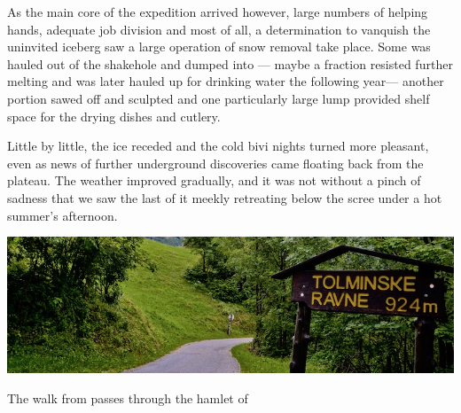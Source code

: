 As the main core of the expedition arrived however, large numbers of helping hands, adequate job division and most of all, a determination to vanquish the uninvited iceberg saw a large operation of snow removal take place. Some was hauled out of the shakehole and dumped into  --- maybe a fraction resisted further melting and was later hauled up for drinking water the following year--- another portion sawed off and sculpted and one particularly large lump provided shelf space for the drying dishes and cutlery.

Little by little, the ice receded and the cold bivi nights turned more pleasant, even as news of further underground discoveries came floating back from the plateau. The weather improved gradually, and it was not without a pinch of sadness that we saw the last of it meekly retreating below the scree under a hot summer's afternoon.


\begin{pagefigure}
\checkoddpage \ifoddpage \forcerectofloat \else \forceversofloat \fi
   \centering
\includegraphics[width = \textwidth]{images/2014/welcome-2014/DSC_1201.jpg}
\caption{The walk from \protect{} passes through the hamlet of \protect{} } \label{fig:ravne_sign}
\end{pagefigure}

